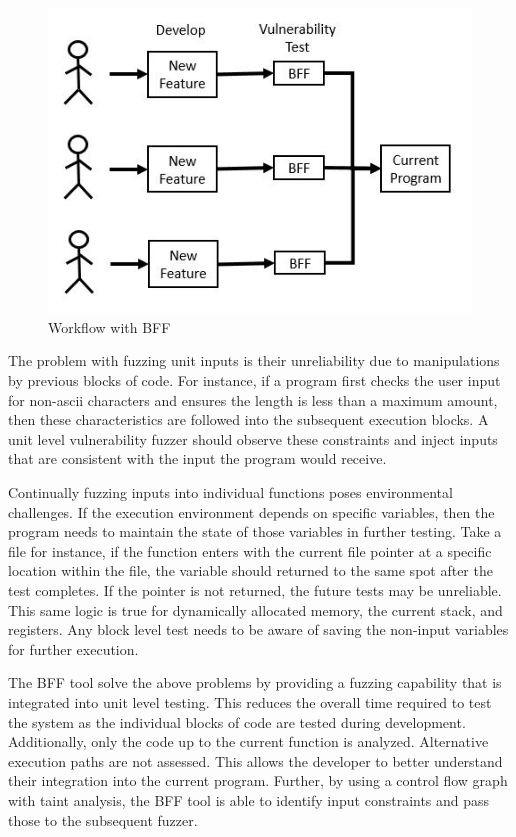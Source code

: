 \documentclass[conference]{IEEEtran}
\begin{document}
\begin{figure}
  \includegraphics[width=\linewidth]{SDLC_BFF.JPG}
  \caption{Workflow with BFF}
  \label{fig:SLDC_BFF}
\end{figure}

The problem with fuzzing unit inputs is their unreliability due to manipulations by previous blocks of code. For instance, if a program first checks the user input for non-ascii characters and ensures the length is less than a maximum amount, then these characteristics are followed into the subsequent execution blocks. A unit level vulnerability fuzzer should observe these constraints and inject inputs that are consistent with the input the program would receive. 

Continually fuzzing inputs into individual functions poses environmental challenges. If the execution environment depends on specific variables, then the program needs to maintain the state of those variables in further testing. Take a file for instance, if the function enters with the current file pointer at a specific location within the file, the variable should returned to the same spot after the test completes. If the pointer is not returned, the future tests may be unreliable. This same logic is true for dynamically allocated memory, the current stack, and registers. Any block level test needs to be aware of saving the non-input variables for further execution.

The BFF tool solve the above problems by providing a fuzzing capability that is integrated into unit level testing. This reduces the overall time required to test the system as the individual blocks of code are tested during development. Additionally, only the code up to the current function is analyzed. Alternative execution paths are not assessed. This allows the developer to better understand their integration into the current program. Further, by using a control flow graph with taint analysis, the BFF tool is able to identify input constraints and pass those to the subsequent fuzzer. 
\end{document}
